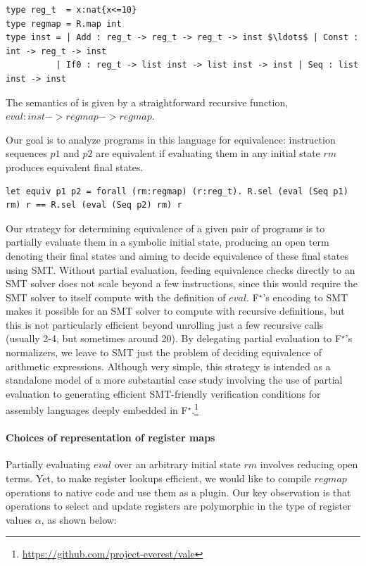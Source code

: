 \documentclass[runningheads]{llncs}
\newcommand\fstar{F$^\star$\xspace}
\begin{document}
\begin{lstlisting}
type reg_t  = x:nat{x<=10}
type regmap = R.map int
type inst = | Add : reg_t -> reg_t -> reg_t -> inst $\ldots$ | Const : int -> reg_t -> inst
          | If0 : reg_t -> list inst -> list inst -> inst | Seq : list inst -> inst
\end{lstlisting}

\noindent The semantics of  is given
by a straightforward recursive function,
%
\ls$eval : inst -> regmap -> regmap$.

Our goal is to analyze programs in this language for equivalence:
instruction sequences \ls$p1$ and \ls$p2$ are equivalent if evaluating them in
any initial state \ls$rm$ produces equivalent final states.

\begin{lstlisting}
let equiv p1 p2 = forall (rm:regmap) (r:reg_t). R.sel (eval (Seq p1) rm) r == R.sel (eval (Seq p2) rm) r
\end{lstlisting}

Our strategy for determining equivalence of a given pair of programs
is to partially evaluate them in a symbolic initial state, producing
an open term denoting their final states and aiming to decide
equivalence of these final states using SMT.
%
Without partial evaluation, feeding equivalence checks directly to an
SMT solver does not scale beyond a few instructions, since
this would require the SMT solver to itself compute with the
definition of \ls$eval$. \fstar's encoding to SMT makes it possible
for an SMT solver to compute with recursive definitions, but this is
not particularly efficient beyond unrolling just a few recursive calls
(usually 2-4, but sometimes around 20).
%
By delegating partial evaluation to \fstar's normalizers, we leave to
SMT just the problem of deciding equivalence of arithmetic expressions.
%
Although very simple, this strategy is intended as a standalone model
of a more substantial case study involving the use of partial
evaluation to generating efficient SMT-friendly verification
conditions for assembly languages deeply embedded
in \fstar.\footnote{\url{https://github.com/project-everest/vale}}

\paragraph{Choices of representation of register maps}
Partially evaluating \ls$eval$ over an arbitrary initial state \ls$rm$
involves reducing open terms. Yet, to make register lookups efficient,
we would like to compile \ls$regmap$ operations to native code and use
them as a plugin. Our key observation is that operations to select and
update registers are polymorphic in the type of register values
$\alpha$, as shown below:
\end{document}

